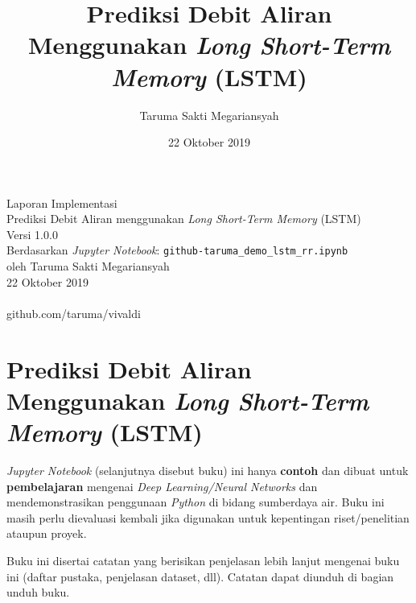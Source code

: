 \documentclass[11pt]{article}
\title{Prediksi Debit Aliran Menggunakan \emph{Long Short-Term Memory} (LSTM)}
\author{Taruma Sakti Megariansyah}
\date{22 Oktober 2019}
\let\oldsection\section
\renewcommand\section{\clearpage\oldsection}
\begin{document}
   
	\begin{titlepage}
		\vspace*{\fill}
		\begin{center}
 		\normalsize Laporan Implementasi \\
		\huge Prediksi Debit Aliran menggunakan \emph{Long Short-Term Memory} (LSTM)\\ 
		\normalsize Versi 1.0.0 \\[0.2cm]
      	\small Berdasarkan \emph{Jupyter Notebook}: \texttt{github-taruma\_demo\_lstm\_rr.ipynb} \\[0.5cm]
		\normalsize oleh Taruma Sakti Megariansyah\\[0.5cm]
      	\normalsize 22 Oktober 2019\\[1cm]
    	\\
      	\normalsize github.com/taruma/vivaldi
		\end{center}
    	\vspace*{\fill}
	\end{titlepage}
    
    

    
    \hypertarget{prediksi-debit-aliran-menggunakan-long-short-term-memory-lstm}{%
\section{\texorpdfstring{Prediksi Debit Aliran Menggunakan \emph{Long
Short-Term Memory}
(LSTM)}{Prediksi Debit Aliran Menggunakan Long Short-Term Memory (LSTM)}}\label{prediksi-debit-aliran-menggunakan-long-short-term-memory-lstm}}

\emph{Jupyter Notebook} (selanjutnya disebut buku) ini hanya
\textbf{contoh} dan dibuat untuk \textbf{pembelajaran} mengenai
\emph{Deep Learning/Neural Networks} dan mendemonstrasikan penggunaan
\emph{Python} di bidang sumberdaya air. Buku ini masih perlu dievaluasi
kembali jika digunakan untuk kepentingan riset/penelitian ataupun
proyek.

Buku ini disertai catatan yang berisikan penjelasan lebih lanjut
mengenai buku ini (daftar pustaka, penjelasan dataset, dll). Catatan
dapat diunduh di bagian unduh buku.
\end{document}
